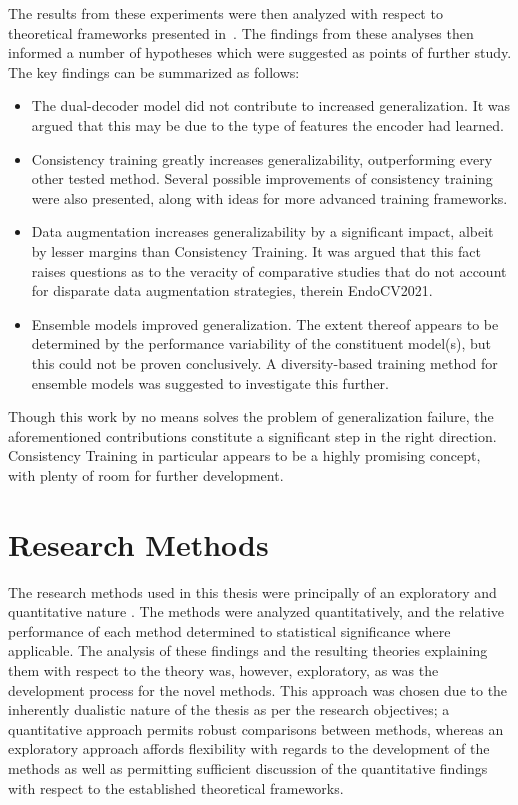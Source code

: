     The results from these experiments were then analyzed with respect to theoretical frameworks presented in~. The findings from these analyses then informed a number of hypotheses which were suggested as points of further study. The key findings can be summarized as follows:
    \begin{itemize}
        \item The dual-decoder model did not contribute to increased generalization. It was argued that this may be due to the type of features the encoder had learned.
    
        \item Consistency training greatly increases generalizability, outperforming every other tested method. Several possible improvements of consistency training were also presented, along with ideas for more advanced training frameworks.
        
        \item Data augmentation increases generalizability by a significant impact, albeit by lesser margins than Consistency Training. It was argued that this fact raises questions as to the veracity of comparative studies that do not account for disparate data augmentation strategies, therein EndoCV2021.
    

        \item Ensemble models improved generalization. The extent thereof appears to be determined by the performance variability of the constituent model(s), but this could not be proven conclusively. A diversity-based training method for ensemble models was suggested to investigate this further.
    \end{itemize}

    Though this work by no means solves the problem of generalization failure, the aforementioned contributions constitute a significant step in the right direction. Consistency Training in particular appears to be a highly promising concept, with plenty of room for further development. 
    
    \section{Research Methods}
    The research methods used in this thesis were principally of an exploratory and quantitative nature \cite{research_methods}. The methods were analyzed quantitatively, and the relative performance of each method determined to statistical significance where applicable. The analysis of these findings and the resulting theories explaining them with respect to the theory was, however, exploratory, as was the development process for the novel methods. This approach was chosen due to the inherently dualistic nature of the thesis as per the research objectives; a quantitative approach permits robust comparisons between methods, whereas an exploratory approach affords flexibility with regards to the development of the methods as well as permitting sufficient discussion of the quantitative findings with respect to the established theoretical frameworks. 
    
